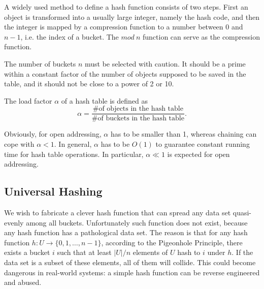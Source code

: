 A widely used method to define a hash function consists of two steps. First an object is transformed into a usually large integer, namely the hash code, and then the integer is mapped by a compression function to a number between $0$ and $n-1$, i.e. the index of a bucket. The  $mod\:n$ function can serve as the compression function. 

The number of buckets $n$ must be selected with caution. It should be a prime within a constant factor of the number of objects supposed to be saved in the table, and it should not be close to a power of 2 or 10.
\begin{definition}
The load factor $\alpha$ of a hash table is defined as 
$$\alpha=\frac{\text{\# of objects in the hash table}}{\text{\# of buckets in the hash table}}.$$
\end{definition}
Obviously, for open addressing, $\alpha$ has to be smaller than 1, whereas chaining can cope with $\alpha<1$.
In general, $\alpha$ has to be $O(1)$ to guarantee constant running time for hash table operations. In particular, $\alpha\ll 1$ is expected for open addressing. 
\subsection{Universal Hashing}
We wish to fabricate a clever hash function that can spread any data set quasi-evenly among all buckets. Unfortunately such function does not exist, because any hash function has a pathological data set. The reason is that for any hash function $h:U\rightarrow\{0,1,\dots,n-1\}$, according to the Pigeonhole Principle,  there exists a bucket $i$ such that at least $\lvert U\rvert/n$ elements of $U$ hash to $i$ under $h$. If the data set is a subset of these elements, all of them will collide. This could become dangerous in real-world systems: a simple hash function can be reverse engineered and abused. 

